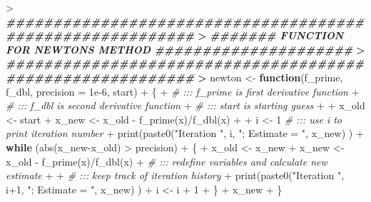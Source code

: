 \documentclass[
]{article}
\newenvironment{Shaded}{\begin{snugshade}}{\end{snugshade}}
\newcommand{\AttributeTok}[1]{\textcolor[rgb]{0.77,0.63,0.00}{#1}}
\newcommand{\CommentTok}[1]{\textcolor[rgb]{0.56,0.35,0.01}{\textit{#1}}}
\newcommand{\ControlFlowTok}[1]{\textcolor[rgb]{0.13,0.29,0.53}{\textbf{#1}}}
\newcommand{\DecValTok}[1]{\textcolor[rgb]{0.00,0.00,0.81}{#1}}
\newcommand{\DocumentationTok}[1]{\textcolor[rgb]{0.56,0.35,0.01}{\textbf{\textit{#1}}}}
\newcommand{\ErrorTok}[1]{\textcolor[rgb]{0.64,0.00,0.00}{\textbf{#1}}}
\newcommand{\FloatTok}[1]{\textcolor[rgb]{0.00,0.00,0.81}{#1}}
\newcommand{\FunctionTok}[1]{\textcolor[rgb]{0.00,0.00,0.00}{#1}}
\newcommand{\NormalTok}[1]{#1}
\newcommand{\OtherTok}[1]{\textcolor[rgb]{0.56,0.35,0.01}{#1}}
\newcommand{\SpecialCharTok}[1]{\textcolor[rgb]{0.00,0.00,0.00}{#1}}
\newcommand{\StringTok}[1]{\textcolor[rgb]{0.31,0.60,0.02}{#1}}
\begin{document}
\begin{Shaded}
\begin{Highlighting}[]
\SpecialCharTok{\textgreater{}} \DocumentationTok{\#\#\#\#\#\#\#\#\#\#\#\#\#\#\#\#\#\#\#\#\#\#\#\#\#\#\#\#\#\#\#\#\#\#\#\#\#\#\#\#\#\#\#\#\#\#\#\#\#\#\#\#\#\#\#\#\#\#}
\ErrorTok{\textgreater{}} \DocumentationTok{\#\#\#\#\#\#\# FUNCTION FOR NEWTON\textquotesingle{}S METHOD \#\#\#\#\#\#\#\#\#\#\#\#\#\#\#\#\#\#\#\#\#}
\ErrorTok{\textgreater{}} \DocumentationTok{\#\#\#\#\#\#\#\#\#\#\#\#\#\#\#\#\#\#\#\#\#\#\#\#\#\#\#\#\#\#\#\#\#\#\#\#\#\#\#\#\#\#\#\#\#\#\#\#\#\#\#\#\#\#\#\#\#\#}
\ErrorTok{\textgreater{}}\NormalTok{ newton }\OtherTok{\textless{}{-}} \ControlFlowTok{function}\NormalTok{(f\_prime, f\_dbl, }\AttributeTok{precision =} \FloatTok{1e{-}6}\NormalTok{, start)}
\SpecialCharTok{+}\NormalTok{ \{}
\SpecialCharTok{+}   \CommentTok{\# ::: f\_prime is first derivative function}
\SpecialCharTok{+}   \CommentTok{\# ::: f\_dbl is second derivative function}
\SpecialCharTok{+}   \CommentTok{\# ::: start is starting \textquotesingle{}guess\textquotesingle{}}
\SpecialCharTok{+}   
\SpecialCharTok{+}\NormalTok{   x\_old }\OtherTok{\textless{}{-}}\NormalTok{ start}
\SpecialCharTok{+}\NormalTok{   x\_new }\OtherTok{\textless{}{-}}\NormalTok{ x\_old }\SpecialCharTok{{-}} \FunctionTok{f\_prime}\NormalTok{(x)}\SpecialCharTok{/}\FunctionTok{f\_dbl}\NormalTok{(x)}
\SpecialCharTok{+}   
\SpecialCharTok{+}\NormalTok{   i }\OtherTok{\textless{}{-}} \DecValTok{1} \CommentTok{\# ::: use \textquotesingle{}i\textquotesingle{} to print iteration number}
\SpecialCharTok{+}   \FunctionTok{print}\NormalTok{(}\FunctionTok{paste0}\NormalTok{(}\StringTok{"Iteration "}\NormalTok{, i, }\StringTok{"; Estimate = "}\NormalTok{, x\_new) )}
\SpecialCharTok{+}   \ControlFlowTok{while}\NormalTok{ (}\FunctionTok{abs}\NormalTok{(x\_new}\SpecialCharTok{{-}}\NormalTok{x\_old) }\SpecialCharTok{\textgreater{}}\NormalTok{ precision)}
\SpecialCharTok{+}\NormalTok{   \{}
\SpecialCharTok{+}\NormalTok{     x\_old }\OtherTok{\textless{}{-}}\NormalTok{ x\_new}
\SpecialCharTok{+}\NormalTok{     x\_new }\OtherTok{\textless{}{-}}\NormalTok{ x\_old }\SpecialCharTok{{-}} \FunctionTok{f\_prime}\NormalTok{(x)}\SpecialCharTok{/}\FunctionTok{f\_dbl}\NormalTok{(x)}
\SpecialCharTok{+}     \CommentTok{\# ::: redefine variables and calculate new estimate}
\SpecialCharTok{+}     
\SpecialCharTok{+}     \CommentTok{\# ::: keep track of iteration history}
\SpecialCharTok{+}     \FunctionTok{print}\NormalTok{(}\FunctionTok{paste0}\NormalTok{(}\StringTok{"Iteration "}\NormalTok{, i}\SpecialCharTok{+}\DecValTok{1}\NormalTok{, }\StringTok{"; Estimate = "}\NormalTok{, x\_new) )}
\SpecialCharTok{+}\NormalTok{     i }\OtherTok{\textless{}{-}}\NormalTok{ i }\SpecialCharTok{+} \DecValTok{1}
\SpecialCharTok{+}\NormalTok{   \}}
\SpecialCharTok{+}\NormalTok{   x\_new}
\SpecialCharTok{+}\NormalTok{ \}}
\end{Highlighting}
\end{Shaded}
\end{document}
